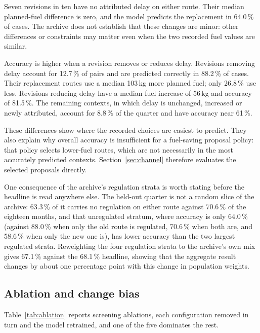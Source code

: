 \documentclass[preprint,authoryear,12pt]{elsarticle}
\begin{document}
Seven revisions in ten have no attributed delay on either route.
Their median planned-fuel difference is zero, and the model predicts
the replacement in 64.0\,\% of cases. The archive does not establish
that these changes are minor: other differences or constraints may
matter even when the two recorded fuel values are similar.

Accuracy is higher when a revision removes or reduces delay. Revisions
removing delay account for 12.7\,\% of pairs and are predicted correctly
in 88.2\,\% of cases. Their replacement routes use a median 103\,kg
more planned fuel; only 26.8\,\% use less. Revisions reducing delay
have a median fuel increase of 56\,kg and accuracy of 81.5\,\%.
The remaining contexts, in which delay is unchanged, increased or newly
attributed, account for 8.8\,\% of the quarter and have accuracy near
61\,\%.

These differences show where the recorded choices are easiest to
predict. They also explain why overall accuracy is insufficient for a
fuel-saving proposal policy: that policy selects lower-fuel routes,
which are not necessarily in the most accurately predicted contexts.
Section~\ref{sec:channel} therefore evaluates the selected proposals
directly.

One consequence of the archive's regulation strata is worth stating
before the headline is read anywhere else. The held-out quarter is not
a random slice of the archive: 63.3\,\% of it carries no regulation on
either route against 70.6\,\% of the eighteen months, and that
unregulated stratum, where accuracy is only 64.0\,\% (against 88.0\,\%
when only the old route is regulated, 70.6\,\% when both are, and
58.6\,\% when only the new one is), has lower accuracy than the two largest regulated strata.
Reweighting the four regulation strata to the archive's own mix gives
67.1\,\% against the 68.1\,\% headline, showing that the aggregate result changes by about one percentage
point with this change in population weights.

\subsection{Ablation and change bias}
\label{sec:changebias}
\label{sec:ablation-sec}

Table~\ref{tab:ablation} reports screening ablations, each
configuration removed in turn and the model retrained, and one of the
five dominates the rest.
\end{document}
